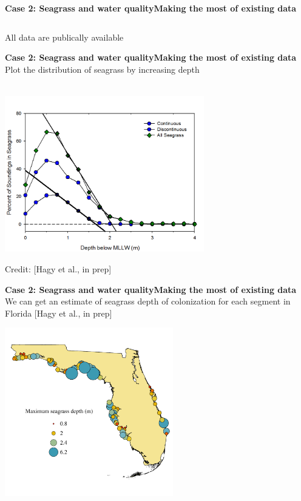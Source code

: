 \documentclass[serif]{beamer}\usepackage[]{graphicx}\usepackage[]{color}
\newenvironment{knitrout}{}{} %
\begin{document}
\begin{frame}{\textbf{Case 2: Seagrass and water quality}}{\textbf{Making the most of existing data}}
\begin{columns}[T]
\begin{column}{0.32\textwidth}
\begin{knitrout}
{}



\end{knitrout}
\end{column}
\end{columns}
\onslide<+->
\vspace{0.15in}
All data are publically available
\end{frame}

\begin{frame}{\textbf{Case 2: Seagrass and water quality}}{\textbf{Making the most of existing data}}
Plot the distribution of seagrass by increasing depth\\~\\
\centerline{\includegraphics[width = 0.65\textwidth]{fig/Hagy_est.png}}
\vfill
\tiny
\hfill Credit: [Hagy et al., in prep]
\end{frame}



\begin{frame}{\textbf{Case 2: Seagrass and water quality}}{\textbf{Making the most of existing data}}
We can get an estimate of seagrass depth of colonization for each segment in Florida \scriptsize [Hagy et al., in prep]
\vspace{-0.25in}
\centerline{\includegraphics[width = 0.55\textwidth]{fig/sgdepthall.pdf}}
\end{frame}
\end{document}
